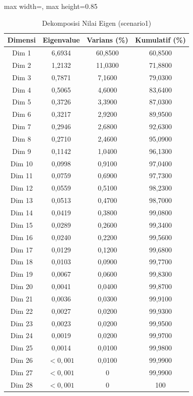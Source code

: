 \begin{table}[H]
\centering
\caption{Dekomposisi Nilai Eigen (scenario1)} \label{tab:app1eigen}
\begin{adjustbox}{max width=\textwidth, max height=0.85\textheight}
\begin{tabular}{|c|c|c|c|}
\hline
\textbf{Dimensi} & \textbf{Eigenvalue} & \textbf{Varians (\%)} & \textbf{Kumulatif (\%)} \\
\hline
Dim 1 & 6,6934 & 60,8500 & 60,8500 \\
Dim 2 & 1,2132 & 11,0300 & 71,8800 \\
Dim 3 & 0,7871 & 7,1600 & 79,0300 \\
Dim 4 & 0,5065 & 4,6000 & 83,6400 \\
Dim 5 & 0,3726 & 3,3900 & 87,0300 \\
Dim 6 & 0,3217 & 2,9200 & 89,9500 \\
Dim 7 & 0,2946 & 2,6800 & 92,6300 \\
Dim 8 & 0,2710 & 2,4600 & 95,0900 \\
Dim 9 & 0,1142 & 1,0400 & 96,1300 \\
Dim 10 & 0,0998 & 0,9100 & 97,0400 \\
Dim 11 & 0,0759 & 0,6900 & 97,7300 \\
Dim 12 & 0,0559 & 0,5100 & 98,2300 \\
Dim 13 & 0,0513 & 0,4700 & 98,7000 \\
Dim 14 & 0,0419 & 0,3800 & 99,0800 \\
Dim 15 & 0,0289 & 0,2600 & 99,3400 \\
Dim 16 & 0,0240 & 0,2200 & 99,5600 \\
Dim 17 & 0,0129 & 0,1200 & 99,6800 \\
Dim 18 & 0,0103 & 0,0900 & 99,7700 \\
Dim 19 & 0,0067 & 0,0600 & 99,8300 \\
Dim 20 & 0,0041 & 0,0400 & 99,8700 \\
Dim 21 & 0,0036 & 0,0300 & 99,9100 \\
Dim 22 & 0,0027 & 0,0200 & 99,9300 \\
Dim 23 & 0,0023 & 0,0200 & 99,9500 \\
Dim 24 & 0,0019 & 0,0200 & 99,9700 \\
Dim 25 & 0,0014 & 0,0100 & 99,9800 \\
Dim 26 & $< 0,001$ & 0,0100 & 99,9900 \\
Dim 27 & $< 0,001$ & 0 & 99,9900 \\
Dim 28 & $< 0,001$ & 0 & 100 \\

\end{tabular}
\end{adjustbox}
\end{table}
